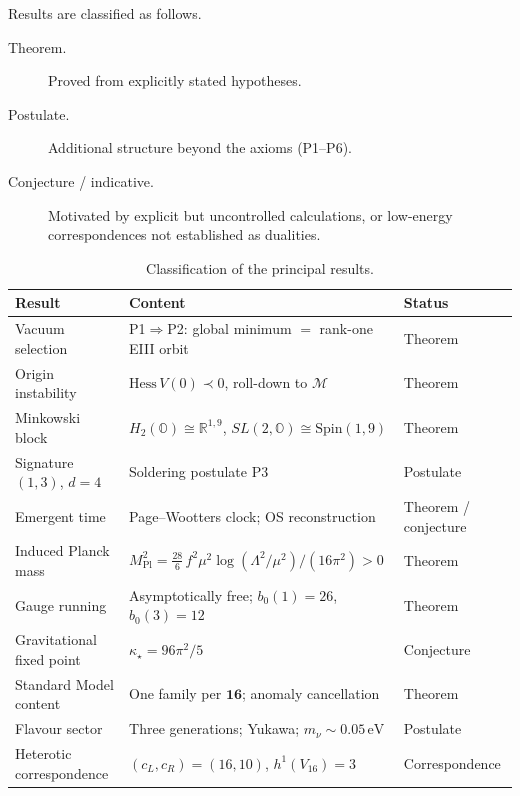 Results are classified as follows.
\begin{description}
  \item[Theorem.] Proved from explicitly stated hypotheses.
  \item[Postulate.] Additional structure beyond the axioms (P1--P6).
  \item[Conjecture / indicative.] Motivated by explicit but uncontrolled
    calculations, or low-energy correspondences not established as dualities.
\end{description}

\begin{table}[t]
  \centering
  \begin{tabular}{@{}lll@{}}
    \toprule
    Result & Content & Status \\
    \midrule
    Vacuum selection
      & P1$\Rightarrow$P2: global minimum $=$ rank-one EIII orbit
      & Theorem \\
    Origin instability
      & $\mathrm{Hess}\,V(0)\prec 0$, roll-down to $\mathcal{M}$
      & Theorem \\
    Minkowski block
      & $H_2(\mathbb{O})\cong\mathbb{R}^{1,9}$, $SL(2,\mathbb{O})\cong\mathrm{Spin}(1,9)$
      & Theorem \\
    Signature $(1,3)$, $d=4$
      & Soldering postulate P3
      & Postulate \\
    Emergent time
      & Page--Wootters clock; OS reconstruction
      & Theorem / conjecture \\
    Induced Planck mass
      & $M_{\mathrm{Pl}}^{2}=\tfrac{28}{6}\,f^{2}\mu^{2}\log(\Lambda^{2}/\mu^{2})/(16\pi^{2})>0$
      & Theorem \\
    Gauge running
      & Asymptotically free; $b_0(1)=26$, $b_0(3)=12$
      & Theorem \\
    Gravitational fixed point
      & $\kappa_\star=96\pi^{2}/5$
      & Conjecture \\
    Standard Model content
      & One family per $\mathbf{16}$; anomaly cancellation
      & Theorem \\
    Flavour sector
      & Three generations; Yukawa; $m_\nu\sim 0.05\,\mathrm{eV}$
      & Postulate \\
    Heterotic correspondence
      & $(c_L,c_R)=(16,10)$, $h^{1}(V_{16})=3$
      & Correspondence \\
    \bottomrule
  \end{tabular}
  \caption{Classification of the principal results.}
  \label{tab:intro:grades}
\end{table}

